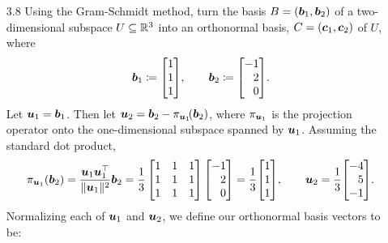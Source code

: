 \documentclass[11pt]{article}
\begin{document}
\begin{enumerate}
    \item[3.8] Using the Gram-Schmidt method, turn the basis $B = (\boldsymbol{b}_1, \boldsymbol{b}_2)$ of a two-dimensional
          subspace $U \subseteq \mathbb{R}^3$ into an orthonormal basis, $C = (\boldsymbol{c}_1, \boldsymbol{c}_2)$ of $U$, where
          \[
              \vect{b}_1 \coloneq
              \begin{bmatrix}
                  1 \\ 1 \\ 1
              \end{bmatrix} \! ,
              \qquad
              \vect{b}_2 \coloneq
              \begin{bmatrix*}[r]
                  -1 \\ 2 \\ 0
              \end{bmatrix*} \! .
          \]
          Let $\boldsymbol{u}_1 = \boldsymbol{b}_1$.  Then let $\boldsymbol{u}_2 = \boldsymbol{b}_2 - \pi_{\boldsymbol{u}_1}\!(\boldsymbol{b}_2)$, where
          $\pi_{\boldsymbol{u}_1}$ is the projection operator onto the one-dimensional subspace spanned by $\boldsymbol{u}_1$.
          Assuming the standard dot product,
          \[
              \pi_{\vect{u}_1}(\vect{b}_2)
              = \frac{ \vect{u}_1 \vect{u}_1^\top }{ \norm{\vect{u}_1}^2 } \vect{b}_2
              = \frac{1}{3}
              \begin{bmatrix}
                  1 & 1 & 1 \\
                  1 & 1 & 1 \\
                  1 & 1 & 1 \\
              \end{bmatrix}
              \begin{bmatrix*}[r]
                  -1 \\ 2 \\ 0
              \end{bmatrix*}
              =
              \frac{1}{3} \!
              \begin{bmatrix}
                  1 \\ 1 \\ 1
              \end{bmatrix} \! ,
              \qquad
              \vect{u}_2 =
              \frac{1}{3} \!
              \begin{bmatrix*}[r]
                  -4 \\ 5  \\ -1
              \end{bmatrix*} \! .
          \]
          Normalizing each of $\boldsymbol{u}_1$ and $\boldsymbol{u}_2$, we define our orthonormal basis vectors to be:

\end{enumerate}
\end{document}
